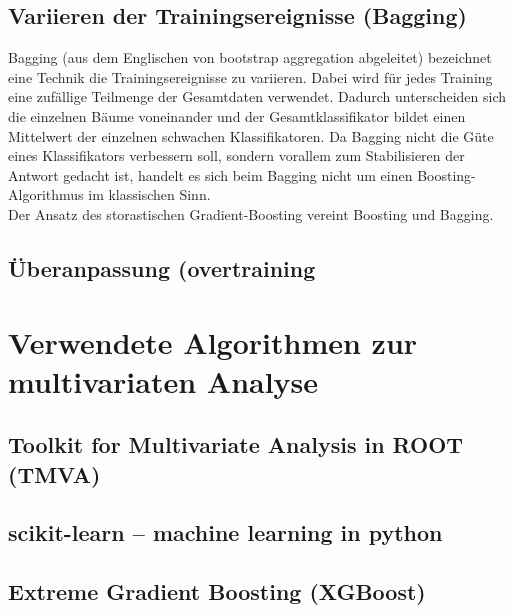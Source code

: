 \subsection{Variieren der Trainingsereignisse (Bagging)}
\label{ch:Algorithmen:subsec:Bagging}

Bagging (aus dem Englischen von bootstrap aggregation abgeleitet) bezeichnet eine Technik die Trainingsereignisse zu variieren. Dabei wird f\"ur jedes Training eine zuf\"allige Teilmenge der Gesamtdaten verwendet. Dadurch unterscheiden sich die einzelnen B\"aume voneinander und der Gesamtklassifikator bildet einen Mittelwert der einzelnen schwachen Klassifikatoren. Da Bagging nicht die G\"ute eines Klassifikators verbessern soll, sondern vorallem zum Stabilisieren der Antwort gedacht ist, handelt es sich beim Bagging nicht um einen Boosting-Algorithmus im klassischen Sinn. \cite{Hocker:2007ht}\\
Der Ansatz des storastischen Gradient-Boosting vereint Boosting und Bagging.

\subsection{\"Uberanpassung (overtraining}
\label{ch:Algorithmen:subsec:overtraining}



\section{Verwendete Algorithmen zur multivariaten Analyse}
\label{ch:Algorithmen:subsec:Implementationen}

\subsection{Toolkit for Multivariate Analysis in ROOT (TMVA)}
\label{ch:Algorithmen:subsec:TMVA}

\subsection{scikit-learn -- machine learning in python}
\label{ch:Algorithmen:subsec:sklearn}

\subsection{Extreme Gradient Boosting (XGBoost)}
\label{ch:Algorithmen:subsec:XGB}
